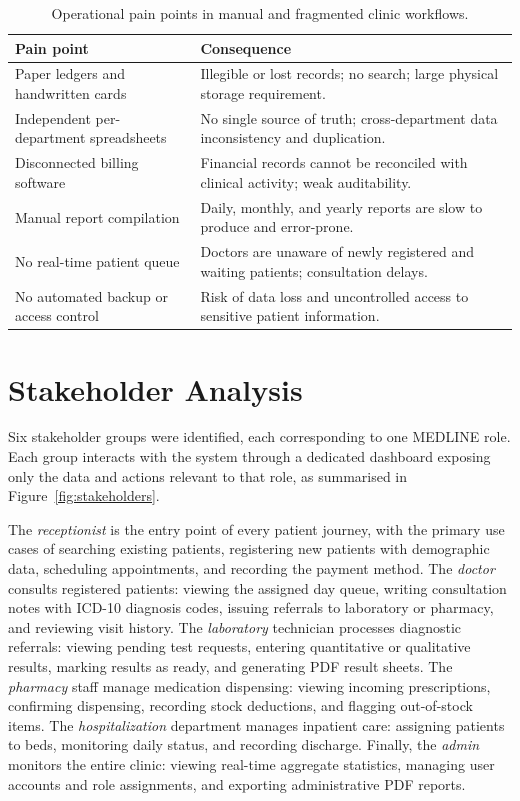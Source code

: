 \documentclass[12pt,a4paper,oneside]{report}
\newcommand{\source}[1]{\par\vspace{2pt}{\small\itshape Source: #1}\par}
\begin{document}
\begin{table}[htbp]
  \centering
  \caption{Operational pain points in manual and fragmented clinic workflows.}
  \label{tab:painpoints}
  \begin{tabularx}{\textwidth}{L{5cm} X}
    \toprule
    \textbf{Pain point} & \textbf{Consequence}\\
    \midrule
    Paper ledgers and handwritten cards & Illegible or lost records; no search;
      large physical storage requirement.\\
    Independent per-department spreadsheets & No single source of truth;
      cross-department data inconsistency and duplication.\\
    Disconnected billing software & Financial records cannot be reconciled with
      clinical activity; weak auditability.\\
    Manual report compilation & Daily, monthly, and yearly reports are slow to
      produce and error-prone.\\
    No real-time patient queue & Doctors are unaware of newly registered and
      waiting patients; consultation delays.\\
    No automated backup or access control & Risk of data loss and uncontrolled
      access to sensitive patient information.\\
    \bottomrule
  \end{tabularx}
  \source{author, based on analysis of the target clinic environment.}
\end{table}

\section{Stakeholder Analysis}

Six stakeholder groups were identified, each corresponding to one MEDLINE role.
Each group interacts with the system through a dedicated dashboard exposing only
the data and actions relevant to that role, as summarised in
Figure~\ref{fig:stakeholders}.

The \emph{receptionist} is the entry point of every patient journey, with the
primary use cases of searching existing patients, registering new patients with
demographic data, scheduling appointments, and recording the payment method.
The \emph{doctor} consults registered patients: viewing the assigned day queue,
writing consultation notes with ICD-10 diagnosis codes, issuing referrals to
laboratory or pharmacy, and reviewing visit history. The \emph{laboratory}
technician processes diagnostic referrals: viewing pending test requests,
entering quantitative or qualitative results, marking results as ready, and
generating PDF result sheets. The \emph{pharmacy} staff manage medication
dispensing: viewing incoming prescriptions, confirming dispensing, recording
stock deductions, and flagging out-of-stock items. The \emph{hospitalization}
department manages inpatient care: assigning patients to beds, monitoring daily
status, and recording discharge. Finally, the \emph{admin} monitors the entire
clinic: viewing real-time aggregate statistics, managing user accounts and role
assignments, and exporting administrative PDF reports.
\end{document}
